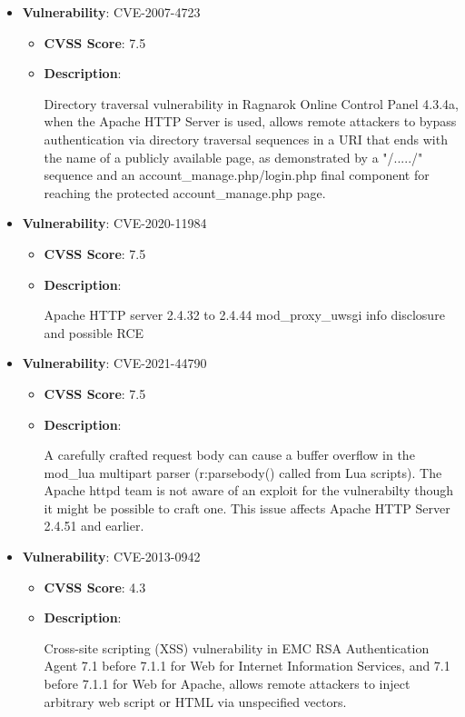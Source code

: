 \documentclass{article}
\begin{document}
\begin{itemize}
        \item \textbf{Vulnerability}: CVE-2007-4723
        \begin{itemize}
            \item \textbf{CVSS Score}:  7.5 
            \item \textbf{Description}:
            \parbox[t]{0.9\linewidth}{
                \ttfamily Directory traversal vulnerability in Ragnarok Online Control Panel 4.3.4a, when the Apache HTTP Server is used, allows remote attackers to bypass authentication via directory traversal sequences in a URI that ends with the name of a publicly available page, as demonstrated by a "/...../" sequence and an account\_manage.php/login.php final component for reaching the protected account\_manage.php page.
            }
        \end{itemize}
    
        \item \textbf{Vulnerability}: CVE-2020-11984
        \begin{itemize}
            \item \textbf{CVSS Score}:  7.5 
            \item \textbf{Description}:
            \parbox[t]{0.9\linewidth}{
                \ttfamily Apache HTTP server 2.4.32 to 2.4.44 mod\_proxy\_uwsgi info disclosure and possible RCE
            }
        \end{itemize}
    
        \item \textbf{Vulnerability}: CVE-2021-44790
        \begin{itemize}
            \item \textbf{CVSS Score}:  7.5 
            \item \textbf{Description}:
            \parbox[t]{0.9\linewidth}{
                \ttfamily A carefully crafted request body can cause a buffer overflow in the mod\_lua multipart parser (r:parsebody() called from Lua scripts). The Apache httpd team is not aware of an exploit for the vulnerabilty though it might be possible to craft one. This issue affects Apache HTTP Server 2.4.51 and earlier.
            }
        \end{itemize}
    
        \item \textbf{Vulnerability}: CVE-2013-0942
        \begin{itemize}
            \item \textbf{CVSS Score}:  4.3 
            \item \textbf{Description}:
            \parbox[t]{0.9\linewidth}{
                \ttfamily Cross-site scripting (XSS) vulnerability in EMC RSA Authentication Agent 7.1 before 7.1.1 for Web for Internet Information Services, and 7.1 before 7.1.1 for Web for Apache, allows remote attackers to inject arbitrary web script or HTML via unspecified vectors.
            }
        \end{itemize}
    

\end{itemize}
\end{document}
